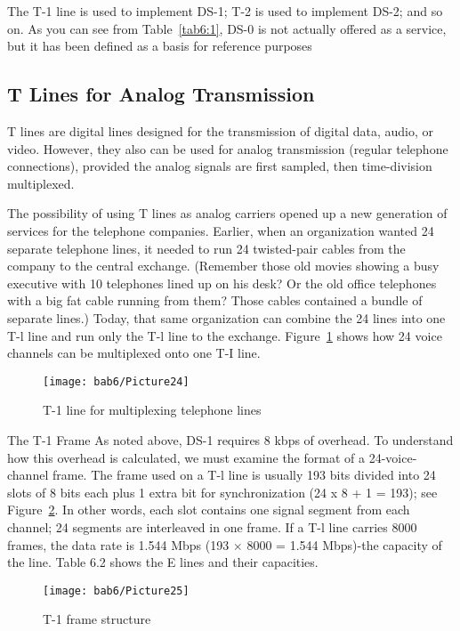 The T-1 line is used to implement DS-1; T-2 is used to implement DS-2; and so on. As you can see from Table~\ref{tab6:1}, DS-0 is not actually offered as a service, but it has been defined as a basis for reference purposes

\subsection*{T Lines for Analog Transmission}
T lines are digital lines designed for the transmission of digital data, audio, or video. However, they also can be used for analog transmission (regular telephone connections), provided the analog signals are first sampled, then time-division multiplexed.

The possibility of using T lines as analog carriers opened up a new generation of services for the telephone companies. Earlier, when an organization wanted 24 separate telephone lines, it needed to run 24 twisted-pair cables from the company to the central exchange. (Remember those old movies showing a busy executive with 10 telephones lined up on his desk? Or the old office telephones with a big fat cable running from them? Those cables contained a bundle of separate lines.) Today, that same organization can combine the 24 lines into one T-l line and run only the T-l line to the exchange. Figure~\ref{fig6:23} shows how 24 voice channels can be multiplexed onto one T-I line.

\begin{figure}[htbp]
  \centering
  \texttt{[image: bab6/Picture24]}
  \caption{T-1 line for multiplexing telephone lines}
  \label{fig6:23}
\end{figure}

The T-1 Frame As noted above, DS-1 requires 8 kbps of overhead. To understand how this overhead is calculated, we must examine the format of a 24-voice-channel frame. The frame used on a T-l line is usually 193 bits divided into 24 slots of 8 bits each plus 1 extra bit for synchronization (24 x 8 + 1 = 193); see Figure~\ref{fig6:24}. In other words, each slot contains one signal segment from each channel; 24 segments are interleaved in one frame. If a T-l line carries 8000 frames, the data rate is 1.544 Mbps (193 $\times$ 8000 = 1.544 Mbps)-the capacity of the line. Table 6.2 shows the E lines and their capacities.

\begin{figure}[htbp]
  \centering
  \texttt{[image: bab6/Picture25]}
  \caption{T-1 frame structure}
  \label{fig6:24}
\end{figure}

